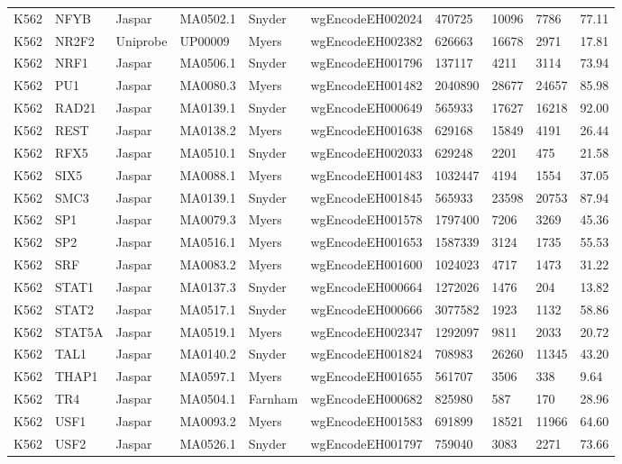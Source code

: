 {\begin{longtable}{p{1.1cm}p{1.0cm}p{1.0cm}p{1.0cm}p{1.0cm}p{2.3cm}p{1.0cm}p{0.8cm}p{0.8cm}p{0.8cm}}
K562 & NFYB & Jaspar & MA0502.1 & Snyder & wgEncodeEH002024 & 470725 & 10096 & 7786 & 77.11\\
K562 & NR2F2 & Uniprobe & UP00009 & Myers & wgEncodeEH002382 & 626663 & 16678 & 2971 & 17.81\\
K562 & NRF1 & Jaspar & MA0506.1 & Snyder & wgEncodeEH001796 & 137117 & 4211 & 3114 & 73.94\\
K562 & PU1 & Jaspar & MA0080.3 & Myers & wgEncodeEH001482 & 2040890 & 28677 & 24657 & 85.98\\
K562 & RAD21 & Jaspar & MA0139.1 & Snyder & wgEncodeEH000649 & 565933 & 17627 & 16218 & 92.00\\
K562 & REST & Jaspar & MA0138.2 & Myers & wgEncodeEH001638 & 629168 & 15849 & 4191 & 26.44\\
K562 & RFX5 & Jaspar & MA0510.1 & Snyder & wgEncodeEH002033 & 629248 & 2201 & 475 & 21.58\\
K562 & SIX5 & Jaspar & MA0088.1 & Myers & wgEncodeEH001483 & 1032447 & 4194 & 1554 & 37.05\\
K562 & SMC3 & Jaspar & MA0139.1 & Snyder & wgEncodeEH001845 & 565933 & 23598 & 20753 & 87.94\\
K562 & SP1 & Jaspar & MA0079.3 & Myers & wgEncodeEH001578 & 1797400 & 7206 & 3269 & 45.36\\
K562 & SP2 & Jaspar & MA0516.1 & Myers & wgEncodeEH001653 & 1587339 & 3124 & 1735 & 55.53\\
K562 & SRF & Jaspar & MA0083.2 & Myers & wgEncodeEH001600 & 1024023 & 4717 & 1473 & 31.22\\
K562 & STAT1 & Jaspar & MA0137.3 & Snyder & wgEncodeEH000664 & 1272026 & 1476 & 204 & 13.82\\
K562 & STAT2 & Jaspar & MA0517.1 & Snyder & wgEncodeEH000666 & 3077582 & 1923 & 1132 & 58.86\\
K562 & STAT5A & Jaspar & MA0519.1 & Myers & wgEncodeEH002347 & 1292097 & 9811 & 2033 & 20.72\\
K562 & TAL1 & Jaspar & MA0140.2 & Snyder & wgEncodeEH001824 & 708983 & 26260 & 11345 & 43.20\\
K562 & THAP1 & Jaspar & MA0597.1 & Myers & wgEncodeEH001655 & 561707 & 3506 & 338 & 9.64\\
K562 & TR4 & Jaspar & MA0504.1 & Farnham & wgEncodeEH000682 & 825980 & 587 & 170 & 28.96\\
K562 & USF1 & Jaspar & MA0093.2 & Myers & wgEncodeEH001583 & 691899 & 18521 & 11966 & 64.60\\
K562 & USF2 & Jaspar & MA0526.1 & Snyder & wgEncodeEH001797 & 759040 & 3083 & 2271 & 73.66\\

\end{longtable}}
